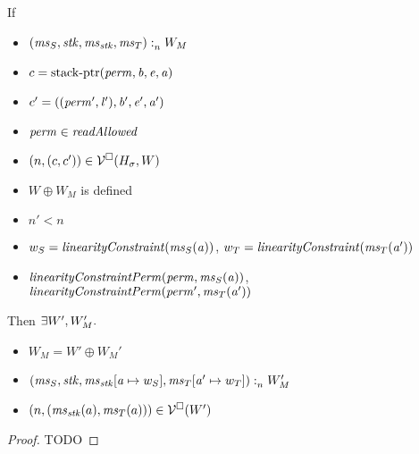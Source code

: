 \documentclass[a4paper]{article}
\begin{document}
\begin{lemma}
  \label{lem:load-stack-cap-works}
  If
  \begin{itemize}
  \item $(\mathit{ms}_S,\mathit{stk},\mathit{ms}_{\mathit{stk}},\mathit{ms}_T) :_{n}^{}W_M$
  \item $c = \mathrm{stack\text{-}ptr}(\mathit{perm},\mathit{b},\mathit{e},\mathit{a})$
  \item $c' = ((\mathit{perm}',\mathit{l}'),\mathit{b}',\mathit{e}',\mathit{a}')$
  \item $\perm \in \readAllowed{}$
  \item $\left(n,(c,c')\right)\in\mathcal{V}^{\square}(H_\sigma,W)$
  \item $W \oplus W_M$ is defined
  \item $n' < n$
  \item $w_S = \linCons{\ms_S(\aaddr)}$, $w_T = \linCons{\ms_T(\aaddr')}$
  \item $\linConsPerm{\perm}{\ms_S(\aaddr)}$, $\linConsPerm{\perm'}{\ms_T(\aaddr')}$
  \end{itemize}
  Then $\exists W', W_M'\ldotp$
  \begin{itemize}
  \item $W_M = W' \oplus W_M'$
  \item $(\mathit{ms}_S,\mathit{stk},\mathit{ms}_{\mathit{stk}}[\mathit{a} \mapsto w_S],\mathit{ms}_T[\mathit{a}' \mapsto w_T]) :_{n}^{}W_M'$
  \item $\left(n,(\mathit{ms}_{\mathit{stk}}(a),\mathit{ms}_T(a))\right) \in \mathcal{V}^{\square}(W')$
  \end{itemize}
\end{lemma}
\begin{proof}
  TODO
\end{proof}
\end{document}
